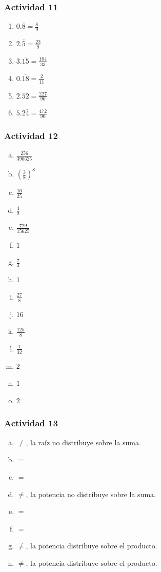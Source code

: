 \documentclass[a4paper, twocolumn]{article}
\begin{document}
\subsubsection*{Actividad 11}
\begin{enumerate}[1)]
\item $0.\overline{8} = \frac{8}{9}$
\item $2.\overline{5} = \frac{23}{9}$
\item $3.\overline{15} = \frac{104}{33}$
\item $0.\overline{18} = \frac{2}{11}$
\item $2.5\overline{2} = \frac{227}{90}$
\item $5.2\overline{4} = \frac{472}{90}$
\end{enumerate}

\subsubsection*{Actividad 12}
\begin{enumerate}[a)]
\item $\frac{256}{390625}$
\item $\left(\frac{3}{8}\right )^8$
\item $\frac{16}{25}$
\item $\frac{4}{9}$
\item $\frac{729}{15625}$
\item $1$
\item $\frac{7}{4}$
\item $1$
\item $\frac{27}{8}$
\item $16$
\item $\frac{125}{8}$
\item $\frac{1}{32}$
\item $2$
\item $1$
\item $2$
\end{enumerate}

\subsubsection*{Actividad 13}
\begin{enumerate}[a)]
\item $\neq$, la raíz no distribuye sobre la suma.
\item $=$
\item $=$
\item $\neq$, la potencia no distribuye sobre la suma.
\item $=$
\item $=$
\item $\neq$, la potencia distribuye sobre el producto.
\item $\neq$, la potencia distribuye sobre el producto.
\end{enumerate}
\end{document}
